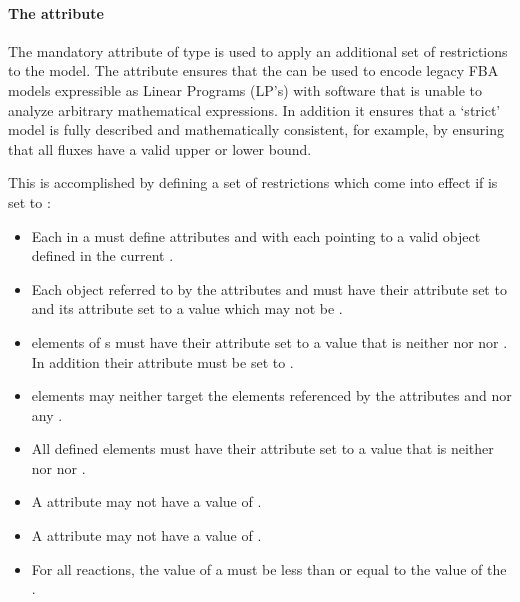 \paragraph{The attribute }
\begin{newsection}

The mandatory attribute  of type  is used to apply an additional set of restrictions to the model. The  attribute ensures that the \FBCPackage can be used to encode legacy FBA models expressible as Linear Programs (LP's) with software that is unable to analyze arbitrary mathematical expressions. In addition it ensures that a `strict' model is fully described and mathematically consistent, for example, by ensuring that all fluxes have a valid upper or lower bound.

This is accomplished by defining a set of restrictions which come into effect if  is set to :
%
\begin{itemize}
	\item { Each \Reaction in a \Model must define attributes  and  with each pointing to a valid \Parameter object defined in the current \Model.}
	\item {Each \Parameter object referred to by the \Reaction attributes  and  must have their  attribute set to  and its  attribute set to a  value which may not be .
	}
	\item { \SpeciesReference elements of {\Reaction}s must have their  attribute set to a  value that is neither  nor  nor . In addition their  attribute must be set to .
	}
	\item { \InitialAssignment elements may neither target the {\Parameter} elements referenced by the \Reaction attributes  and
	         nor any \SpeciesReference.
	}
	\item { All defined \FluxObjective elements must have their  attribute set to a  value that is neither  nor  nor .
	}
	\item { A \Reaction {} attribute may not have a value of .}
	\item { A \Reaction {} attribute may not have a value of .}
    \item {For all reactions, the value of a  must be less than or equal to the value of the .}


\end{itemize}
\end{newsection}
